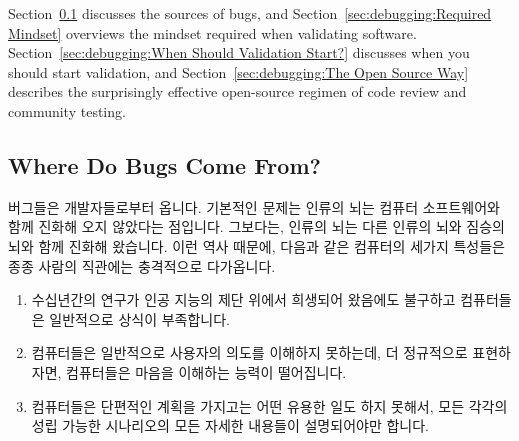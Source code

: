 Section~\ref{sec:debugging:Where Do Bugs Come From?}
discusses the sources of bugs, and
Section~\ref{sec:debugging:Required Mindset}
overviews the mindset required when validating software.
Section~\ref{sec:debugging:When Should Validation Start?}
discusses when you should start validation, and
Section~\ref{sec:debugging:The Open Source Way} describes the
surprisingly effective open-source regimen of code review and
community testing.
\fi

\subsection{Where Do Bugs Come From?}
\label{sec:debugging:Where Do Bugs Come From?}

버그들은 개발자들로부터 옵니다.
기본적인 문제는 인류의 뇌는 컴퓨터 소프트웨어와 함께 진화해 오지 않았다는
점입니다.
그보다는, 인류의 뇌는 다른 인류의 뇌와 짐승의 뇌와 함께 진화해 왔습니다.
이런 역사 때문에, 다음과 같은 컴퓨터의 세가지 특성들은 종종 사람의 직관에는
충격적으로 다가옵니다.

\begin{enumerate}
\item	수십년간의 연구가 인공 지능의 제단 위에서 희생되어 왔음에도 불구하고
	컴퓨터들은 일반적으로 상식이 부족합니다.
\item	컴퓨터들은 일반적으로 사용자의 의도를 이해하지 못하는데, 더 정규적으로
	표현하자면, 컴퓨터들은 마음을 이해하는 능력이 떨어집니다.
\item	컴퓨터들은 단편적인 계획을 가지고는 어떤 유용한 일도 하지 못해서, 모든
	각각의 성립 가능한 시나리오의 모든 자세한 내용들이 설명되어야만 합니다.

\end{enumerate}

